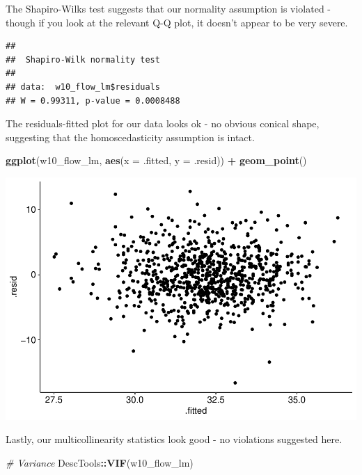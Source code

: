 \documentclass[
]{book}
\newenvironment{Shaded}{\begin{snugshade}}{\end{snugshade}}
\newcommand{\AttributeTok}[1]{\textcolor[rgb]{0.13,0.29,0.53}{#1}}
\newcommand{\CommentTok}[1]{\textcolor[rgb]{0.56,0.35,0.01}{\textit{#1}}}
\newcommand{\FunctionTok}[1]{\textcolor[rgb]{0.13,0.29,0.53}{\textbf{#1}}}
\newcommand{\NormalTok}[1]{#1}
\newcommand{\SpecialCharTok}[1]{\textcolor[rgb]{0.81,0.36,0.00}{\textbf{#1}}}
\begin{document}
The Shapiro-Wilks test suggests that our normality assumption is violated - though if you look at the relevant Q-Q plot, it doesn't appear to be very severe.

\begin{Shaded}
\end{Shaded}

\begin{verbatim}
## 
##  Shapiro-Wilk normality test
## 
## data:  w10_flow_lm$residuals
## W = 0.99311, p-value = 0.0008488
\end{verbatim}

The residuals-fitted plot for our data looks ok - no obvious conical shape, suggesting that the homoscedasticity assumption is intact.

\begin{Shaded}
\begin{Highlighting}[]
\FunctionTok{ggplot}\NormalTok{(w10\_flow\_lm, }\FunctionTok{aes}\NormalTok{(}\AttributeTok{x =}\NormalTok{ .fitted, }\AttributeTok{y =}\NormalTok{ .resid)) }\SpecialCharTok{+}
  \FunctionTok{geom\_point}\NormalTok{()}
\end{Highlighting}
\end{Shaded}

\includegraphics{_main_files/figure-latex/unnamed-chunk-223-1.pdf}

Lastly, our multicollinearity statistics look good - no violations suggested here.

\begin{Shaded}
\begin{Highlighting}[]
\CommentTok{\# Variance}
\NormalTok{DescTools}\SpecialCharTok{::}\FunctionTok{VIF}\NormalTok{(w10\_flow\_lm)}
\end{Highlighting}
\end{Shaded}
\end{document}
